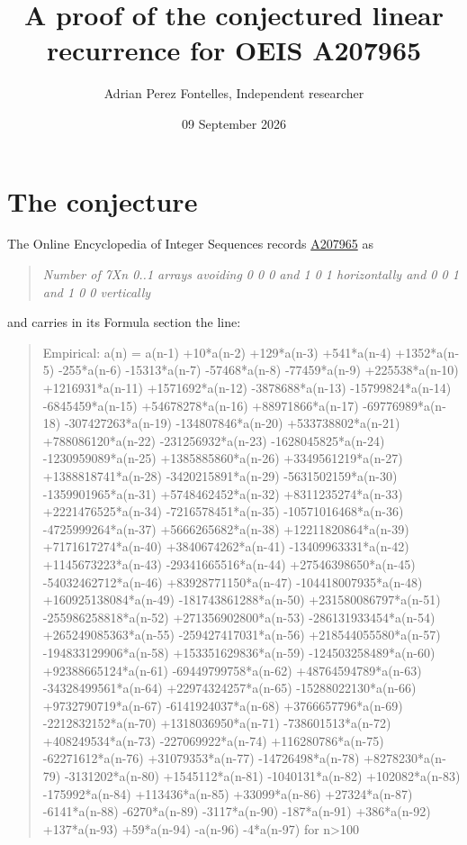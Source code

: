 \documentclass[11pt]{article}
\title{A proof of the conjectured linear recurrence for OEIS A207965}
\author{Adrian Perez Fontelles, Independent researcher}
\date{09 September 2026}
\theoremstyle{definition}
\begin{document}
\maketitle
\section{The conjecture}

The Online Encyclopedia of Integer Sequences records \href{https://oeis.org/A207965}{A207965} as

\begin{quote}\itshape Number of 7Xn 0..1 arrays avoiding 0 0 0 and 1 0 1 horizontally and 0 0 1 and 1 0 0 vertically\end{quote}

and carries in its Formula section the line:

\begin{quote}\ttfamily Empirical: a(n) = a(n-1) +10*a(n-2) +129*a(n-3) +541*a(n-4) +1352*a(n-5) -255*a(n-6) -15313*a(n-7) -57468*a(n-8) -77459*a(n-9) +225538*a(n-10) +1216931*a(n-11) +1571692*a(n-12) -3878688*a(n-13) -15799824*a(n-14) -6845459*a(n-15) +54678278*a(n-16) +88971866*a(n-17) -69776989*a(n-18) -307427263*a(n-19) -134807846*a(n-20) +533738802*a(n-21) +788086120*a(n-22) -231256932*a(n-23) -1628045825*a(n-24) -1230959089*a(n-25) +1385885860*a(n-26) +3349561219*a(n-27) +1388818741*a(n-28) -3420215891*a(n-29) -5631502159*a(n-30) -1359901965*a(n-31) +5748462452*a(n-32) +8311235274*a(n-33) +2221476525*a(n-34) -7216578451*a(n-35) -10571016468*a(n-36) -4725999264*a(n-37) +5666265682*a(n-38) +12211820864*a(n-39) +7171617274*a(n-40) +3840674262*a(n-41) -13409963331*a(n-42) +1145673223*a(n-43) -29341665516*a(n-44) +27546398650*a(n-45) -54032462712*a(n-46) +83928771150*a(n-47) -104418007935*a(n-48) +160925138084*a(n-49) -181743861288*a(n-50) +231580086797*a(n-51) -255986258818*a(n-52) +271356902800*a(n-53) -286131933454*a(n-54) +265249085363*a(n-55) -259427417031*a(n-56) +218544055580*a(n-57) -194833129906*a(n-58) +153351629836*a(n-59) -124503258489*a(n-60) +92388665124*a(n-61) -69449799758*a(n-62) +48764594789*a(n-63) -34328499561*a(n-64) +22974324257*a(n-65) -15288022130*a(n-66) +9732790719*a(n-67) -6141924037*a(n-68) +3766657796*a(n-69) -2212832152*a(n-70) +1318036950*a(n-71) -738601513*a(n-72) +408249534*a(n-73) -227069922*a(n-74) +116280786*a(n-75) -62271612*a(n-76) +31079353*a(n-77) -14726498*a(n-78) +8278230*a(n-79) -3131202*a(n-80) +1545112*a(n-81) -1040131*a(n-82) +102082*a(n-83) -175992*a(n-84) +113436*a(n-85) +33099*a(n-86) +27324*a(n-87) -6141*a(n-88) -6270*a(n-89) -3117*a(n-90) -187*a(n-91) +386*a(n-92) +137*a(n-93) +59*a(n-94) -a(n-96) -4*a(n-97) for n>100\end{quote}
\end{document}
